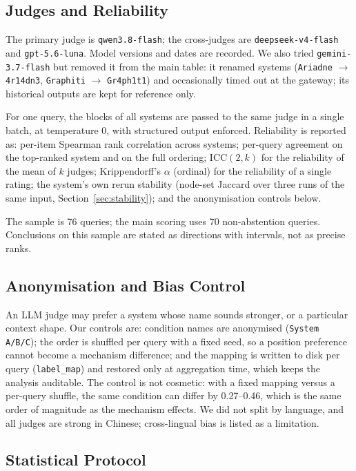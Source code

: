 \documentclass[11pt]{article}
\begin{document}
\subsection{Judges and Reliability}

The primary judge is \texttt{qwen3.8-flash}; the cross-judges are \texttt{deepseek-v4-flash} and
\texttt{gpt-5.6-luna}. Model versions and dates are recorded. We also tried
\texttt{gemini-3.7-flash} but removed it from the main table: it renamed systems
(\texttt{Ariadne} $\rightarrow$ \texttt{4r14dn3}, \texttt{Graphiti} $\rightarrow$
\texttt{Gr4ph1t1}) and occasionally timed out at the gateway; its historical outputs are kept
for reference only.

For one query, the blocks of all systems are passed to the same judge in a single batch, at
temperature 0, with structured output enforced. Reliability is reported as: per-item Spearman
rank correlation across systems; per-query agreement on the top-ranked system and on the full
ordering; $\mathrm{ICC}(2,k)$ for the reliability of the mean of $k$ judges; Krippendorff's
$\alpha$ (ordinal) for the reliability of a single rating; the system's own rerun stability
(node-set Jaccard over three runs of the same input, Section~\ref{sec:stability}); and the
anonymisation controls below.

The sample is 76 queries; the main scoring uses 70 non-abstention queries. Conclusions on this
sample are stated as directions with intervals, not as precise ranks.

\subsection{Anonymisation and Bias Control}

An LLM judge may prefer a system whose name sounds stronger, or a particular context shape. Our
controls are: condition names are anonymised (\texttt{System A/B/C}); the order is shuffled per
query with a fixed seed, so a position preference cannot become a mechanism difference; and the
mapping is written to disk per query (\texttt{label\_map}) and restored only at aggregation
time, which keeps the analysis auditable. The control is not cosmetic: with a fixed mapping
versus a per-query shuffle, the same condition can differ by 0.27--0.46, which is the same order
of magnitude as the mechanism effects. We did not split by language, and all judges are strong
in Chinese; cross-lingual bias is listed as a limitation.

\subsection{Statistical Protocol}
\label{sec:stats}
\end{document}

